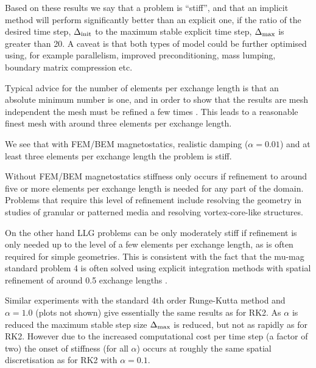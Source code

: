 \documentclass[10pt, final, conference, transmag]{IEEEtran}
\begin{document}
Based on these results we say that a problem is ``stiff'', and that an implicit method will perform significantly better than an explicit one, if the ratio of the desired time step, $\Delta_{\text{init}}$ to the maximum stable explicit time step, $\Delta_{\text{max}}$ is greater than 20.
A caveat is that both types of model could be further optimised using, for example parallelism, improved preconditioning, mass lumping, boundary matrix compression\cite[Sec. 3]{Knittel2011} etc.

Typical advice for the number of elements per exchange length is that an absolute minimum number is one, and in order to show that the results are mesh independent the mesh must be refined a few times \cite[Sec. 11]{nmag-manual}.
This leads to a reasonable finest mesh with around three elements per exchange length.

We see that with FEM/BEM magnetostatics, realistic damping ($\alpha = 0.01$) and at least three elements per exchange length the problem is stiff.

Without FEM/BEM magnetostatics stiffness only occurs if refinement to around five or more elements per exchange length is needed for any part of the domain.
Problems that require this level of refinement include resolving the geometry in studies of granular or patterned media\cite{Suess2002} and resolving vortex-core-like structures\cite{Andreas2014}.

On the other hand LLG problems can be only moderately stiff if refinement is only needed up to the level of a few elements per exchange length, as is often required for simple geometries.
This is consistent with the fact that the mu-mag standard problem 4 is often solved using explicit integration methods with spatial refinement of around 0.5 exchange lengths \cite{mumag-website}.

Similar experiments with the standard 4th order Runge-Kutta method\cite[41]{Iserles2009} and $\alpha=1.0$ (plots not shown) give essentially the same results as for RK2. As $\alpha$ is reduced the maximum stable step size $\Delta_{\text{max}}$ is reduced, but not as rapidly as for RK2. However due to the increased computational cost per time step (a factor of two) the onset of stiffness (for all $\alpha$) occurs at roughly the same spatial discretisation as for RK2 with $\alpha = 0.1$.
\end{document}
